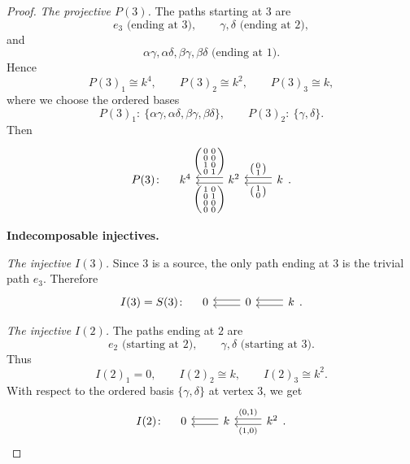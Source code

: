 \documentclass[11pt, a4paper]{article}
\begin{document}
\begin{enumerate}[leftmargin=*, label=\textbf{\arabic*.}]
\begin{proof}
    \smallskip
    \noindent\emph{The projective $P(3)$.}
    The paths starting at $3$ are
    \[
    e_3 \text{ (ending at $3$)},\qquad
    \gamma,\delta \text{ (ending at $2$)},
    \]
    and
    \[
    \alpha\gamma,\alpha\delta,\beta\gamma,\beta\delta \text{ (ending at $1$)}.
    \]
    Hence
    \[
    P(3)_1 \cong k^4,\qquad P(3)_2 \cong k^2,\qquad P(3)_3 \cong k,
    \]
    where we choose the ordered bases
    \[
    P(3)_1:\ \{\alpha\gamma,\alpha\delta,\beta\gamma,\beta\delta\},
    \qquad
    P(3)_2:\ \{\gamma,\delta\}.
    \]
    Then
    \[
    P(3)\colon\quad
    \begin{tikzcd}[ampersand replacement=\&]
    k^4
    \&
    k^2 \arrow[l, "{\begin{psmallmatrix}
    1&0\\
    0&1\\
    0&0\\
    0&0
    \end{psmallmatrix}}", shift left]
    \arrow[l, "{\begin{psmallmatrix}
    0&0\\
    0&0\\
    1&0\\
    0&1
    \end{psmallmatrix}}"', shift right]
    \&
    k \arrow[l, "{\begin{psmallmatrix}1\\0\end{psmallmatrix}}", shift left]
      \arrow[l, "{\begin{psmallmatrix}0\\1\end{psmallmatrix}}"', shift right]
    \end{tikzcd}.
    \]
    
    \medskip
    \noindent\textbf{Indecomposable injectives.}
    
    \smallskip
    \noindent\emph{The injective $I(3)$.}
    Since $3$ is a source, the only path ending at $3$ is the trivial path $e_3$.
    Therefore
    \[
    I(3)=S(3)\colon\quad
    \begin{tikzcd}
    0 & 0 \arrow[l, shift left] \arrow[l, shift right] & k \arrow[l, shift left] \arrow[l, shift right]
    \end{tikzcd}.
    \]
    
    \smallskip
    \noindent\emph{The injective $I(2)$.}
    The paths ending at $2$ are
    \[
    e_2 \text{ (starting at $2$)}, \qquad \gamma,\delta \text{ (starting at $3$)}.
    \]
    Thus
    \[
    I(2)_1=0,\qquad I(2)_2\cong k,\qquad I(2)_3\cong k^2.
    \]
    With respect to the ordered basis $\{\gamma,\delta\}$ at vertex $3$, we get
    \[
    I(2)\colon\quad
    \begin{tikzcd}
    0 & k \arrow[l, shift left] \arrow[l, shift right]
      & k^2 \arrow[l, "{(1,0)}", shift left]
            \arrow[l, "{(0,1)}"', shift right]
    \end{tikzcd}.
    \]
    

\end{proof}
\end{enumerate}
\end{document}

